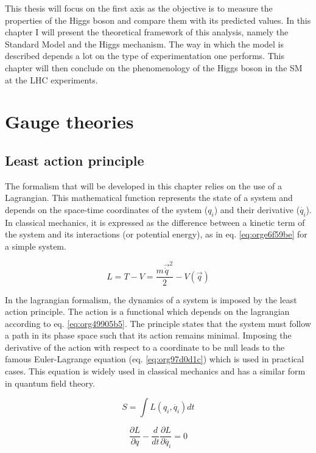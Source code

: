 This thesis will focus on the first axis as the objective is to measure the properties of the Higgs boson and compare them with its predicted values.
In this chapter I will present the theoretical framework of this analysis, namely the Standard Model and the Higgs mechanism.
The way in which the model is described depends a lot on the type of experimentation one performs.
This chapter will then conclude on the phenomenology of the Higgs boson in the SM at the LHC experiments.


\section{Gauge theories}
\label{sec:org5fbff7e}
\subsection{Least action principle}
\label{sec:org24ae533}

The formalism that will be developed in this chapter relies on the use of a Lagrangian.
This mathematical function represents the state of a system and depends on the space-time coordinates of the system (\(q_i\)) and their derivative (\(\dot{q_i}\)).
In classical mechanics, it is expressed as the difference between a kinetic term of the system and its interactions (or potential energy), as in eq. \ref{eq:orge6f59be} for a simple system.

\begin{equation}
\label{eq:orge6f59be}
L=T-V = \frac{m\vec{\dot{q}}^2}{2}-V(\vec{q})
\end{equation}

In the lagrangian formalism, the dynamics of a system is imposed by the least action principle.
The action is a functional which depends on the lagrangian according to eq. \ref{eq:org49905b5}.
The principle states that the system must follow a path in its phase space such that its action remains minimal.
Imposing the derivative of the action with respect to a coordinate to be null leads to the famous Euler-Lagrange equation (eq. \ref{eq:org97d0d1c}) which is used in practical cases.
This equation is widely used in classical mechanics and has a similar form in quantum field theory.

\begin{equation}
\label{eq:org49905b5}
S=\int L( q_i, \dot{q_i}) dt
\end{equation}

\begin{equation}
\label{eq:org97d0d1c}
\frac{\partial L}{\partial q} - \frac{d}{dt}\frac{\partial L}{\partial \dot{q_i}}=0
\end{equation}



